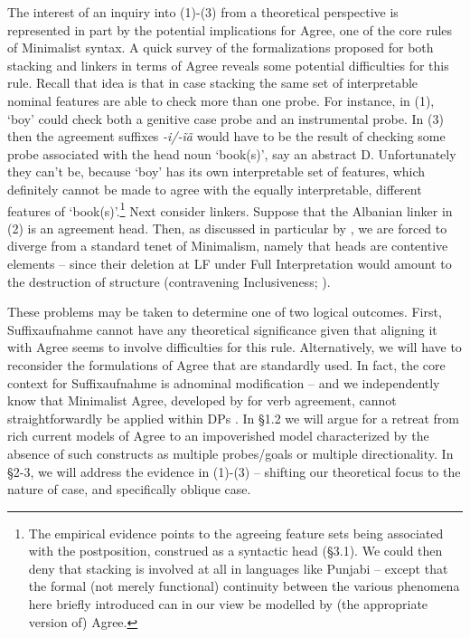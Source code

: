 \documentclass[output=paper]{langsci/langscibook}
\begin{document}
The interest of an inquiry into (1)-(3) from a theoretical perspective is represented in part by the potential implications for Agree, one of the core rules of Minimalist syntax. A quick survey of the formalizations proposed for both stacking and linkers in terms of Agree reveals some potential difficulties for this rule. Recall that  idea is that in case stacking the same set of interpretable nominal features are able to check more than one probe. For instance, in (1), ‘boy’ could check both a genitive case probe and an instrumental probe. In (3) then the agreement suffixes \textit{{}-}\textit{i/-ĩã} would have to be the result of checking some probe associated with the head noun ‘book(s)’, say an abstract D. Unfortunately they can’t be, because ‘boy’ has its own interpretable set of features, which definitely cannot be made to agree with the equally interpretable, different features of ‘book(s)’.\footnote{The empirical evidence points to the agreeing feature sets being associated with the postposition, construed as a syntactic head (§3.1). We could then deny that stacking is involved at all in languages like Punjabi – except that the formal (not merely functional) continuity between the various phenomena here briefly introduced can in our view be modelled by (the appropriate version of) Agree.} Next consider linkers. Suppose that the Albanian linker in (2) is an agreement head. Then, as discussed in particular by \citet{Philip2012}, we are forced to diverge from a standard tenet of Minimalism, namely that heads are contentive elements – since their deletion at LF under Full Interpretation would amount to the destruction of structure (contravening Inclusiveness; \citealt{Chomsky1995}). 

These problems may be taken to determine one of two logical outcomes. First, Suffixaufnahme cannot have any theoretical significance given that aligning it with Agree seems to involve difficulties for this rule. Alternatively, we will have to reconsider the formulations of Agree that are standardly used. In fact, the core context for Suffixaufnahme is adnominal modification – and we independently know that Minimalist Agree, developed by \citet{Chomsky2000,Chomsky2001} for verb agreement, cannot straightforwardly be applied within DPs \citep{Carstens2001}. In §1.2 we will argue for a retreat from rich current models of Agree to an impoverished model characterized by the absence of such constructs as multiple probes/goals or multiple directionality. In §2-3, we will address the evidence in (1)-(3) – shifting our theoretical focus to the nature of case, and specifically oblique case.
\end{document}
